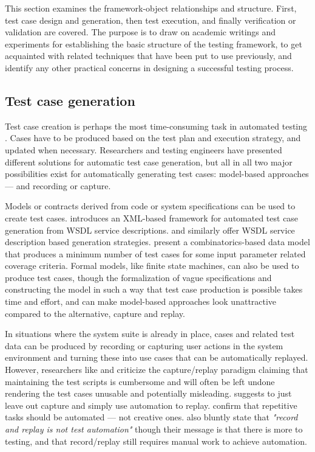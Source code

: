 \documentclass[12pt,a4paper,oneside,pdftex]{report}
\begin{document}
This section examines the framework-object relationships and structure. First, test case design and generation, then test execution, and finally verification or validation are covered. The purpose is to draw on academic writings and experiments for establishing the basic structure of the testing framework, to get acquainted with related techniques that have been put to use previously, and identify any other practical concerns in designing a successful testing process.

\subsection{Test case generation}

Test case creation is perhaps the most time-consuming task in automated testing \citep{kit1999integrated}. Cases have to be produced based on the test plan and execution strategy, and updated when necessary. Researchers and testing engineers have presented different solutions for automatic test case generation, but all in all two major possibilities exist for automatically generating test cases: model-based approaches --- and recording or capture.

Models or contracts derived from code or system specifications can be used to create test cases. \citet{tsai2002coyote} introduces an XML-based framework for automated test case generation from WSDL service descriptions. \citet{bai2005WSDL} and \citet{di2007web} similarly offer WSDL service description based generation strategies. \citet{dalal1999model} present a combinatorics-based data model that produces a minimum number of test cases for some input parameter related coverage criteria. Formal models, like finite state machines, can also be used to produce test cases, though the formalization of vague specifications and constructing the model in such a way that test case production is possible takes time and effort, and can make model-based approaches look unattractive compared to the alternative, capture and replay. 

In situations where the system suite is already in place, cases and related test data can be produced by recording or capturing user actions in the system environment and turning these into use cases that can be automatically replayed. However, researchers like \citet{zallar2001you} and \citet{kit1999integrated} criticize the capture/replay paradigm claiming that maintaining the test scripts is cumbersome and will often be left undone rendering the test cases unusable and potentially misleading. \citet{kit1999integrated} suggests to just leave out capture and simply use automation to replay. \citet{pezze2008software} confirm that repetitive tasks should be automated --- not creative ones. \citet{fewster1999software} also bluntly state that \emph{"record and replay is not test automation"} though their message is that there is more to testing, and that record/replay still requires manual work to achieve automation. 
\end{document}
